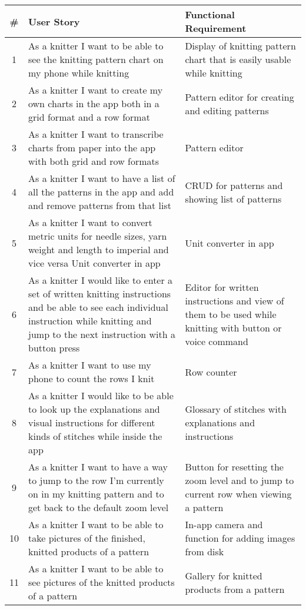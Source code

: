 \label{tabl:requirements}
\begin{longtable}{| c | p{6.5cm} | p{6.5cm} |}
    \hline
   	\# & User Story & Functional Requirement \\ \hline
   	\endhead
    1 &	As a knitter I want to be able to see the knitting pattern chart on my phone while knitting &
	 Display of knitting pattern chart that is easily usable while knitting \\ \hline
	2 & As a knitter I want to create my own charts in the app both in a grid format and a row format & Pattern editor for creating and editing patterns \\ \hline
	3 & As a knitter I want to transcribe charts from paper into the app with both grid and row formats & Pattern editor \\ \hline
	4 & As a knitter I want to have a list of all the patterns in the app and add and remove patterns from that list & CRUD for patterns and showing list of patterns \\ \hline
	5 & As a knitter I want to convert metric units for needle sizes, yarn weight and length to imperial and vice versa Unit converter in app & Unit converter in app  \\ \hline
	6 & As a knitter I would like to enter a set of written knitting instructions and be able to see each individual instruction while knitting and jump to the next instruction with a button press & Editor for written instructions and view of them to be used while knitting with button or voice command \\ \hline
	7 & As a knitter I want to use my phone to count the rows I knit & Row counter \\ \hline
	8 & As a knitter I would like to be able to look up the explanations and visual instructions for different kinds of stitches while inside the app & Glossary of stitches with explanations and instructions \\ \hline
	9 & As a knitter I want to have a way to jump to the row I'm currently on in my knitting pattern and to get back to the default zoom level & Button for resetting the zoom level and to jump to current row when viewing a pattern \\ \hline
	10 & As a knitter I want to be able to take pictures of the finished, knitted products of a pattern & In-app camera and function for adding images from disk \\ \hline
	11 & As a knitter I want to be able to see pictures of the knitted products of a pattern & Gallery for knitted products from a pattern \\ \hline

\end{longtable}
